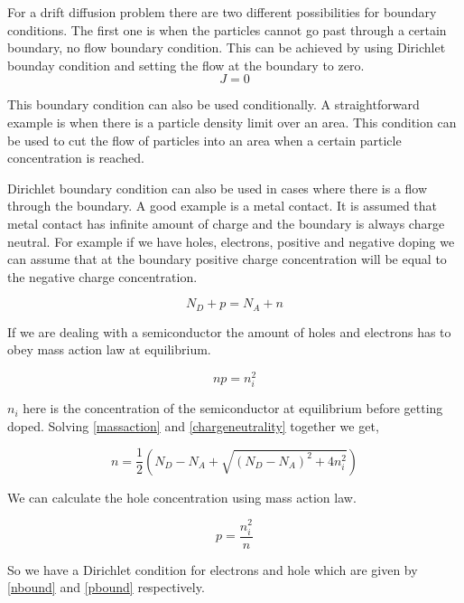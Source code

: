 For a drift diffusion problem there are two different possibilities for boundary conditions. The first one is when the particles cannot go past through a certain boundary, no flow boundary condition. This can be achieved by using Dirichlet bounday condition and setting the flow at the boundary to zero. 
\begin{equation}
J=0
\end{equation}

This boundary condition can also be used conditionally. A straightforward example is when there is a particle density limit over an area. This condition can be used to cut the flow of particles into an area when a certain particle concentration is reached. 

Dirichlet boundary condition can also be used in cases where there is a flow through the boundary. A good example is a metal contact. It is assumed that metal contact has infinite amount of charge and the boundary is always charge neutral. For example if we have holes, electrons, positive and negative doping we can assume that at the boundary positive charge concentration will be equal to the negative charge concentration. 

\begin{equation}
N_{D} + p=N_{A} + n
\label{chargeneutrality}
\end{equation}

If we are dealing with a semiconductor the amount of holes and electrons has to obey mass action law at equilibrium.

\begin{equation}
np=n_i^2
\label{massaction}
\end{equation}

$n_i$ here is the concentration of the semiconductor at equilibrium before getting doped. Solving \eqref{massaction} and \eqref{chargeneutrality} together we get,

\begin{equation}
n=\frac{1}{2}(N_D - N_A + \sqrt{(N_D - N_A)^2+4n_i^2})
\label{nbound}
\end{equation}

We can calculate the hole concentration using mass action law.

\begin{equation}
p=\frac{n_i^2}{n}
\label{pbound}
\end{equation}

So we have a Dirichlet condition for electrons and hole which are given by \ref{nbound} and \ref{pbound} respectively.


